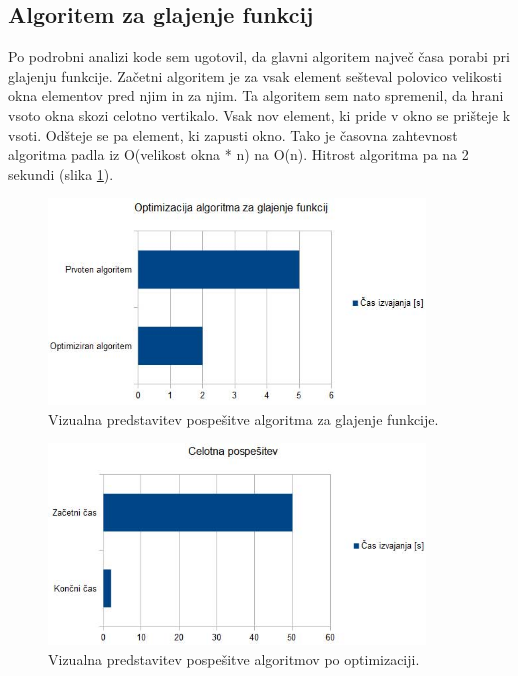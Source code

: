 \documentclass[oneside, a4paper, 12pt]{book}
\begin{document}
\subsection{Algoritem za glajenje funkcij}
Po podrobni analizi kode sem ugotovil, da glavni algoritem največ časa porabi pri glajenju funkcije. Začetni algoritem je za vsak element sešteval polovico velikosti okna elementov pred njim in za njim. Ta algoritem sem nato spremenil, da hrani vsoto okna skozi celotno vertikalo. Vsak nov element, ki pride v okno se prišteje k vsoti. Odšteje se pa element, ki zapusti okno. Tako je časovna zahtevnost algoritma padla iz O(velikost okna * n) na O(n). Hitrost algoritma pa na 2 sekundi (slika \ref{pic:opt-g}).


\begin{figure}
\begin{center}
\includegraphics[width=10cm]{slike/optimizacija_grafi/optimizacija-algoritma-za-glajenje-funkcij.jpg}
\end{center}
\caption{Vizualna predstavitev pospešitve algoritma za glajenje funkcije.}
\label{pic:opt-g}
\end{figure}

\begin{figure}
\begin{center}
\includegraphics[width=10cm]{slike/optimizacija_grafi/celotna-pospesitev.jpg}
\end{center}
\caption{Vizualna predstavitev pospešitve algoritmov po optimizaciji.}
\label{pic:opt-c}
\end{figure}
\end{document}
